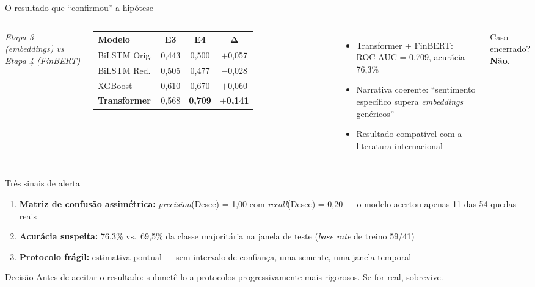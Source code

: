 \documentclass[11pt,aspectratio=169]{beamer}
\begin{document}
\begin{frame}{O resultado que ``confirmou'' a hipótese}
  \begin{columns}[T]
    \begin{table}
      \footnotesize
      {\scriptsize\itshape Etapa 3 (\textit{embeddings}) vs Etapa 4 (FinBERT)}\\[0.5ex]
      \begin{tabular}{lccc}
        \toprule
        \textbf{Modelo} & \textbf{E3} & \textbf{E4} & $\boldsymbol{\Delta}$ \\
        \midrule
        BiLSTM Orig.    & 0{,}443 & 0{,}500 & $+$0{,}057 \\
        BiLSTM Red.     & 0{,}505 & 0{,}477 & $-$0{,}028 \\
        XGBoost         & 0{,}610 & 0{,}670 & $+$0{,}060 \\
        \textbf{Transformer} & 0{,}568 & \alert{\textbf{0{,}709}} & \textbf{$+$0{,}141} \\
        \bottomrule
      \end{tabular}
    \end{table}
    \begin{itemize}
      \item Transformer + FinBERT: \alert{ROC-AUC = 0{,}709}, acurácia 76{,}3\%
      \item Narrativa coerente: ``sentimento específico supera \textit{embeddings} genéricos''
      \item Resultado compatível com a literatura internacional
    \end{itemize}
    \vspace{1ex}
    \centering\large
    Caso encerrado? \alert{\textbf{Não.}}
  \end{columns}
\end{frame}

\begin{frame}{Três sinais de alerta}
  \begin{enumerate}
    \item \textbf{Matriz de confusão assimétrica:} \textit{precision}(Desce) = 1{,}00 com \textit{recall}(Desce) = 0{,}20 --- o modelo acertou apenas \alert{11 das 54 quedas reais}
    \item \textbf{Acurácia suspeita:} 76{,}3\% vs.\ \alert{69{,}5\%} da classe majoritária na janela de teste (\textit{base rate} de treino 59/41)
    \item \textbf{Protocolo frágil:} estimativa pontual --- \alert{sem} intervalo de confiança, \alert{uma} semente, \alert{uma} janela temporal
  \end{enumerate}
  \vspace{2ex}
  \begin{block}{Decisão}
    Antes de aceitar o resultado: submetê-lo a protocolos progressivamente
    mais rigorosos. Se for real, sobrevive.
  \end{block}
\end{frame}
\end{document}
